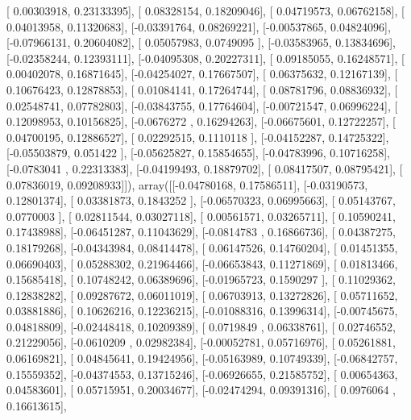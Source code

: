 \documentclass{article}
\begin{document}
       [ 0.00303918,  0.23133395],
       [ 0.08328154,  0.18209046],
       [ 0.04719573,  0.06762158],
       [ 0.04013958,  0.11320683],
       [-0.03391764,  0.08269221],
       [-0.00537865,  0.04824096],
       [-0.07966131,  0.20604082],
       [ 0.05057983,  0.0749095 ],
       [-0.03583965,  0.13834696],
       [-0.02358244,  0.12393111],
       [-0.04095308,  0.20227311],
       [ 0.09185055,  0.16248571],
       [ 0.00402078,  0.16871645],
       [-0.04254027,  0.17667507],
       [ 0.06375632,  0.12167139],
       [ 0.10676423,  0.12878853],
       [ 0.01084141,  0.17264744],
       [ 0.08781796,  0.08836932],
       [ 0.02548741,  0.07782803],
       [-0.03843755,  0.17764604],
       [-0.00721547,  0.06996224],
       [ 0.12098953,  0.10156825],
       [-0.0676272 ,  0.16294263],
       [-0.06675601,  0.12722257],
       [ 0.04700195,  0.12886527],
       [ 0.02292515,  0.1110118 ],
       [-0.04152287,  0.14725322],
       [-0.05503879,  0.051422  ],
       [-0.05625827,  0.15854655],
       [-0.04783996,  0.10716258],
       [-0.0783041 ,  0.22313383],
       [-0.04199493,  0.18879702],
       [ 0.08417507,  0.08795421],
       [ 0.07836019,  0.09208933]]), array([[-0.04780168,  0.17586511],
       [-0.03190573,  0.12801374],
       [ 0.03381873,  0.1843252 ],
       [-0.06570323,  0.06995663],
       [ 0.05143767,  0.0770003 ],
       [ 0.02811544,  0.03027118],
       [ 0.00561571,  0.03265711],
       [ 0.10590241,  0.17438988],
       [-0.06451287,  0.11043629],
       [-0.0814783 ,  0.16866736],
       [ 0.04387275,  0.18179268],
       [-0.04343984,  0.08414478],
       [ 0.06147526,  0.14760204],
       [ 0.01451355,  0.06690403],
       [ 0.05288302,  0.21964466],
       [-0.06653843,  0.11271869],
       [ 0.01813466,  0.15685418],
       [ 0.10748242,  0.06389696],
       [-0.01965723,  0.1590297 ],
       [ 0.11029362,  0.12838282],
       [ 0.09287672,  0.06011019],
       [ 0.06703913,  0.13272826],
       [ 0.05711652,  0.03881886],
       [ 0.10626216,  0.12236215],
       [-0.01088316,  0.13996314],
       [-0.00745675,  0.04818809],
       [-0.02448418,  0.10209389],
       [ 0.0719849 ,  0.06338761],
       [ 0.02746552,  0.21229056],
       [-0.0610209 ,  0.02982384],
       [-0.00052781,  0.05716976],
       [ 0.05261881,  0.06169821],
       [ 0.04845641,  0.19424956],
       [-0.05163989,  0.10749339],
       [-0.06842757,  0.15559352],
       [-0.04374553,  0.13715246],
       [-0.06926655,  0.21585752],
       [ 0.00654363,  0.04583601],
       [ 0.05715951,  0.20034677],
       [-0.02474294,  0.09391316],
       [ 0.0976064 ,  0.16613615],
\end{document}
